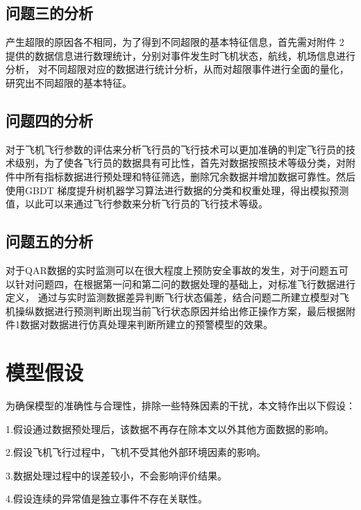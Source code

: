 \documentclass[UTF8]{ctexart}
\begin{document}
	\subsection{问题三的分析}
	产生超限的原因各不相同，为了得到不同超限的基本特征信息，首先需对附件 2 提供的数据信息进行数理统计，分别对事件发生时飞机状态，航线，机场信息进行分析， 对不同超限对应的数据进行统计分析，从而对超限事件进行全面的量化，研究出不同超限的基本特征。 \par
	\subsection{问题四的分析}
	对于飞机飞行参数的评估来分析飞行员的飞行技术可以更加准确的判定飞行员的技术级别，为了使各飞行员的数据具有可比性，首先对数据按照技术等级分类，对附件中所有指标数据进行预处理和特征筛选，删除冗余数据并增加数据可靠性。然后使用GBDT 梯度提升树机器学习算法进行数据的分类和权重处理，得出模拟预测值，以此可以来通过飞行参数来分析飞行员的飞行技术等级。 \par
	\subsection{问题五的分析}
	对于QAR数据的实时监测可以在很大程度上预防安全事故的发生，对于问题五可以针对问题四，在根据第一问和第二问的数据处理的基础上，对标准飞行数据进行定义， 通过与实时监测数据差异判断飞行状态偏差，结合问题二所建立模型对飞机操纵数据进行预测判断出现当前飞行状态原因并给出修正操作方案，最后根据附件1数据对数据进行仿真处理来判断所建立的预警模型的效果。 \par
	\section{模型假设}
	为确保模型的准确性与合理性，排除一些特殊因素的干扰，本文特作出以下假设：\par
	1.假设通过数据预处理后，该数据不再存在除本文以外其他方面数据的影响。 \par
	2.假设飞机飞行过程中，飞机不受其他外部环境因素的影响。 \par
	3.数据处理过程中的误差较小，不会影响评价结果。 \par
	4.假设连续的异常值是独立事件不存在关联性。 
\end{document}
